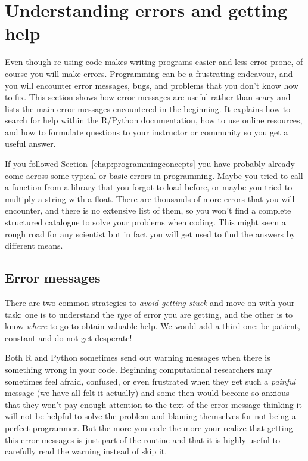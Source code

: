 \section{Understanding errors and getting help}
\label{sec:errors}

Even though re-using code makes writing programs easier and less error-prone, of course you will make errors. 
Programming can be a frustrating endeavour, and you will encounter error messages, bugs, and problems that you don’t know how to fix. This section shows how error messages are useful rather than scary and lists the main error messages encountered in the beginning. It explains how to search for help within the R/Python documentation, how to use online resources, and how to formulate questions to your instructor or community so you get a useful answer. 

If you followed Section~\ref{chap:programmingconcepts} you have probably already come across some typical or basic errors in programming. Maybe you tried to call a function from a library that you forgot to load before, or maybe you tried to multiply a string with a float.
There are thousands of more errors that you will encounter, and there is no extensive list of them, so you won't find a complete structured catalogue to solve your problems when coding. This might seem a rough road for any scientist but in fact you will get used to find the answers by different means.

\subsection{Error messages}


There are two common strategies to \textit{avoid getting stuck} and move on with your task: one is to understand the \textit{type} of error you are getting, and the other is to know \textit{where} to go to obtain valuable help. We would add a third one: be patient, constant and do not get desperate!

Both R and Python sometimes send out warning messages when there is something wrong in your code. Beginning computational researchers may sometimes feel afraid, confused, or even frustrated when they get such a \textit{painful} message (we have all felt it actually) and some then would become so anxious that they won't pay enough attention to the text of the error message thinking it will not be helpful to solve the problem and blaming themselves for not being a perfect programmer. But the more you code the more your realize that getting this error messages is just part of the routine and that it is highly useful to carefully read the warning instead of skip it.

